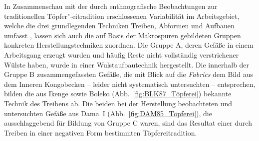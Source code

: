 In Zusammenschau mit der durch enthnografische Beobachtungen zur traditionellen Töpfer"-eitradition erschlossenen Variabilität im Arbeitsgebiet, welche die drei grundlegenden Techniken Treiben, Abformen und Aufbauen umfasst \parencite[44]{Drost.1967}, lassen sich auch die auf Basis der Makrospuren gebildeten Gruppen konkreten Herstellungstechniken zuordnen. Die Gruppe A, deren Gefäße in einem Arbeitsgang erzeugt wurden und häufig Reste nicht vollständig verstrichener Wülste haben, wurde in einer Wulstaufbautechnik hergestellt. Die innerhalb der Gruppe B zusammengefassten Gefäße, die mit Blick auf die \textit{Fabrics} dem Bild aus dem Inneren Kongobecken -- leider nicht systematisch untersuchten -- entsprechen, bilden die aus Ikenge \parencites{Eggert.1980c}{Wotzka.1991} sowie Boleko (Abb.~\ref{fig:BLK87_Töpferei}) bekannte Technik des Treibens ab. Die beiden bei der Herstellung beobachteten und untersuchten Gefäße aus Dama~I (Abb.~\ref{fig:DAM85_Töpferei}), die ausschlaggebend für Bildung von Gruppe C waren, sind das Resultat einer durch Treiben in einer negativen Form bestimmten Töpfereitradition.

